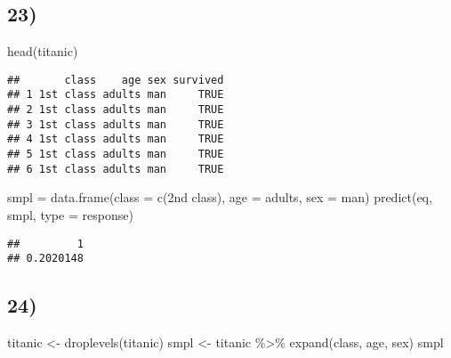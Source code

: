 \documentclass[
]{article}
\newenvironment{Shaded}{\begin{snugshade}}{\end{snugshade}}
\newcommand{\AttributeTok}[1]{\textcolor[rgb]{0.77,0.63,0.00}{#1}}
\newcommand{\FunctionTok}[1]{\textcolor[rgb]{0.00,0.00,0.00}{#1}}
\newcommand{\NormalTok}[1]{#1}
\newcommand{\OtherTok}[1]{\textcolor[rgb]{0.56,0.35,0.01}{#1}}
\newcommand{\SpecialCharTok}[1]{\textcolor[rgb]{0.00,0.00,0.00}{#1}}
\newcommand{\StringTok}[1]{\textcolor[rgb]{0.31,0.60,0.02}{#1}}
\begin{document}
\hypertarget{section-21}{%
\subsection{23)}\label{section-21}}

\begin{Shaded}
\begin{Highlighting}[]
\FunctionTok{head}\NormalTok{(titanic)}
\end{Highlighting}
\end{Shaded}

\begin{verbatim}
##       class    age sex survived
## 1 1st class adults man     TRUE
## 2 1st class adults man     TRUE
## 3 1st class adults man     TRUE
## 4 1st class adults man     TRUE
## 5 1st class adults man     TRUE
## 6 1st class adults man     TRUE
\end{verbatim}

\begin{Shaded}
\begin{Highlighting}[]
\NormalTok{smpl }\OtherTok{=} \FunctionTok{data.frame}\NormalTok{(}\AttributeTok{class =} \FunctionTok{c}\NormalTok{(}\StringTok{\textquotesingle{}2nd class\textquotesingle{}}\NormalTok{), }\AttributeTok{age =} \StringTok{\textquotesingle{}adults\textquotesingle{}}\NormalTok{, }\AttributeTok{sex =} \StringTok{\textquotesingle{}man\textquotesingle{}}\NormalTok{)}
\FunctionTok{predict}\NormalTok{(eq, smpl, }\AttributeTok{type =} \StringTok{\textquotesingle{}response\textquotesingle{}}\NormalTok{)}
\end{Highlighting}
\end{Shaded}

\begin{verbatim}
##         1 
## 0.2020148
\end{verbatim}

\hypertarget{section-22}{%
\subsection{24)}\label{section-22}}

\begin{Shaded}
\begin{Highlighting}[]
\NormalTok{titanic }\OtherTok{\textless{}{-}} \FunctionTok{droplevels}\NormalTok{(titanic)}
\NormalTok{smpl }\OtherTok{\textless{}{-}}\NormalTok{ titanic }\SpecialCharTok{\%\textgreater{}\%} \FunctionTok{expand}\NormalTok{(class, age, sex)}
\NormalTok{smpl}
\end{Highlighting}
\end{Shaded}
\end{document}
